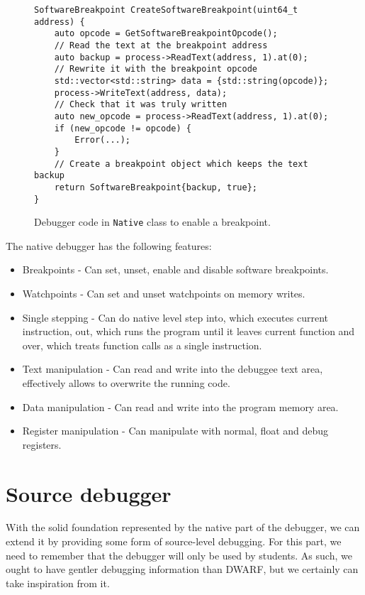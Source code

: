 \begin{figure}
    \begin{verbatim}
SoftwareBreakpoint CreateSoftwareBreakpoint(uint64_t address) {
    auto opcode = GetSoftwareBreakpointOpcode();
    // Read the text at the breakpoint address
    auto backup = process->ReadText(address, 1).at(0);
    // Rewrite it with the breakpoint opcode
    std::vector<std::string> data = {std::string(opcode)};
    process->WriteText(address, data);
    // Check that it was truly written
    auto new_opcode = process->ReadText(address, 1).at(0);
    if (new_opcode != opcode) {
        Error(...);
    }
    // Create a breakpoint object which keeps the text backup
    return SoftwareBreakpoint{backup, true};
}
    \end{verbatim}
    \caption{Debugger code in \texttt{Native} class to enable a breakpoint.}
    \label{t86dbg:breakpoint}
\end{figure}

The native debugger has the following features:
\begin{itemize}
    \item Breakpoints - Can set, unset, enable and disable software breakpoints.
    \item Watchpoints - Can set and unset watchpoints on memory writes.
    \item Single stepping - Can do native level step into, which executes
        current instruction, out, which runs the program until it leaves
        current function and over, which treats function calls as a single
        instruction.
    \item Text manipulation - Can read and write into the debuggee text area,
        effectively allows to overwrite the running code.
    \item Data manipulation - Can read and write into the program memory area.
    \item Register manipulation - Can manipulate with normal, float and debug registers.
\end{itemize}

\section{Source debugger}\label{section:source-debugger}
With the solid foundation represented by the native part of the debugger, we
can extend it by providing some form of source-level debugging. For this part,
we need to remember that the debugger will only be used by students. As such,
we ought to have gentler debugging information than DWARF, but we certainly can
take inspiration from it.

